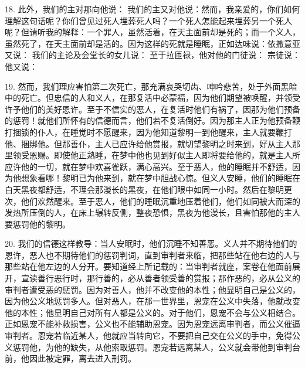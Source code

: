 18. 此外，我们的主对那向他说： 我们的主又对他说：然而，我亲爱的，你们如何理解这句话呢？你们曾见过死人埋葬死人吗？一个死人怎能起来埋葬另一个死人呢？但请听我的解释：一个罪人，虽然活着，在天主面前却是死的；而一个义人，虽然死了，在天主面前却是活的。因为这样的死就是睡眠，正如达味说：依撒意亚又说： 我们的主论及会堂长的女儿说： 至于拉匝禄，他对他的门徒说： 宗徒说： 他又说：\par

19. 然而，我们理应害怕第二次死亡，那充满哀哭切齿、呻吟悲苦，处于外面黑暗中的死亡。但忠信的人和义人，在那复活中必蒙福，因为他们期望被唤醒，并领受许予他们的美好恩许。至于不信实的恶人，在复活时他们有祸了，因那为他们预备的惩罚！就他们所怀有的信德而言，他们若不复活倒好。因为那主人正为他预备鞭打捆锁的仆人，在睡觉时不愿醒来，因为他知道黎明一到他醒来，主人就要鞭打他、捆绑他。但那善仆，主人已应许给他赏报，就切望黎明之时来到，好从主人那里领受恩赐。即使他正熟睡，在梦中他也见到好似主人即将要给他的，就是主人所应许他的一切，就在梦中欢喜雀跃，满心高兴。至于恶人，他的睡眠并不舒适，因为他想象看哪！黎明已为他来到，就在梦中胆战心惊。但义人安睡，他们的睡眠在白天黑夜都舒适，不理会那漫长的黑夜，在他们眼中如同一小时。然后在黎明更次，他们欢然醒来。至于恶人，他们的睡眠沉重地压着他们，他们如同被大而深的发热所压倒的人，在床上辗转反侧，整夜恐惧，黑夜为他漫长，且害怕那他的主人要惩罚他的黎明。\par

20. 我们的信德这样教导：当人安眠时，他们沉睡不知善恶。义人并不期待他们的恩许，恶人也不期待他们的惩罚判词，直到审判者来临，把那些站在他右边的人与那些站在他左边的人分开。要知道经上所记载的：当审判者就座，案卷在他面前展开，宣读善行恶行时，那行善的，必从善者领受善的赏报；那作恶的，必从公义的审判者遭受恶的惩罚。因为对善人，他并不改变他的本性；他显明自己是公义的，因为他公义地惩罚多人。但对恶人，在那一世界里，恩宠在公义中失落，他就改变他的本性；他显明自己对所有人都是公义的。对于他们，恩宠不会与公义相结合。正如恩宠不能补救损害，公义也不能辅助恩宠。因为恩宠远离审判者，而公义催逼审判者。恩宠若临近某人，他就应当转向它，不要把自己交在公义的手中，免得公义惩罚他，为他的缺失，从他索取惩罚。恩宠若远离某人，公义就会带他到审判台前，他因此被定罪，离去进入刑罚。\par

